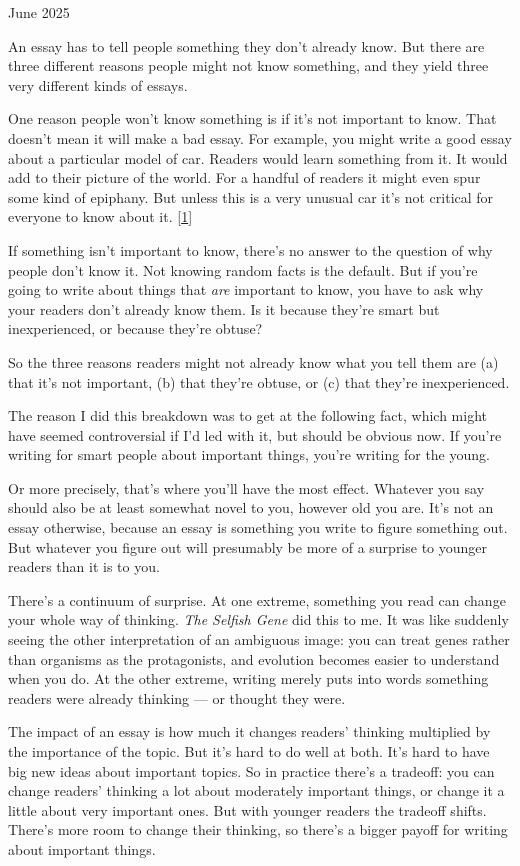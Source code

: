 June 2025

An essay has to tell people something they don't already know. But there
are three different reasons people might not know something, and they
yield three very different kinds of essays.

One reason people won't know something is if it's not important to know.
That doesn't mean it will make a bad essay. For example, you might write
a good essay about a particular model of car. Readers would learn
something from it. It would add to their picture of the world. For a
handful of readers it might even spur some kind of epiphany. But unless
this is a very unusual car it's not critical for everyone to know about
it. {[}\hyperref[f1n]{1}{]}

If something isn't important to know, there's no answer to the question
of why people don't know it. Not knowing random facts is the default.
But if you're going to write about things that \emph{are} important to
know, you have to ask why your readers don't already know them. Is it
because they're smart but inexperienced, or because they're obtuse?

So the three reasons readers might not already know what you tell them
are (a) that it's not important, (b) that they're obtuse, or (c) that
they're inexperienced.

The reason I did this breakdown was to get at the following fact, which
might have seemed controversial if I'd led with it, but should be
obvious now. If you're writing for smart people about important things,
you're writing for the young.

Or more precisely, that's where you'll have the most effect. Whatever
you say should also be at least somewhat novel to you, however old you
are. It's not an essay otherwise, because an essay is something you
write to figure something out. But whatever you figure out will
presumably be more of a surprise to younger readers than it is to you.

There's a continuum of surprise. At one extreme, something you read can
change your whole way of thinking. \emph{The Selfish Gene} did this to
me. It was like suddenly seeing the other interpretation of an ambiguous
image: you can treat genes rather than organisms as the protagonists,
and evolution becomes easier to understand when you do. At the other
extreme, writing merely puts into words something readers were already
thinking --- or thought they were.

The impact of an essay is how much it changes readers' thinking
multiplied by the importance of the topic. But it's hard to do well at
both. It's hard to have big new ideas about important topics. So in
practice there's a tradeoff: you can change readers' thinking a lot
about moderately important things, or change it a little about very
important ones. But with younger readers the tradeoff shifts. There's
more room to change their thinking, so there's a bigger payoff for
writing about important things.

